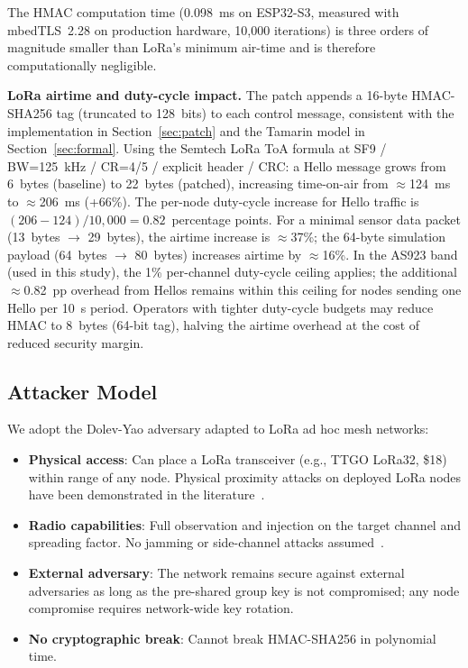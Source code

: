 \documentclass[preprint,12pt]{elsarticle}
\begin{document}
The HMAC computation time (0.098~ms on ESP32-S3, measured with
mbedTLS~2.28 on production hardware, 10{,}000 iterations) is three
orders of magnitude smaller than LoRa's minimum air-time and is
therefore computationally negligible.

\textbf{LoRa airtime and duty-cycle impact.}
The patch appends a 16-byte HMAC-SHA256 tag (truncated to 128~bits)
to each control message, consistent with the implementation
in Section~\ref{sec:patch} and the Tamarin model in
Section~\ref{sec:formal}. Using the Semtech LoRa ToA formula at
SF9 / BW=125~kHz / CR=4/5 / explicit header / CRC:
a Hello message grows from 6~bytes (baseline) to 22~bytes (patched),
increasing time-on-air from $\approx$124~ms to $\approx$206~ms
(+66\%). The per-node duty-cycle increase for Hello traffic is
$(206-124)/10{,}000 = 0.82$~percentage points. For a minimal sensor data packet
(13~bytes $\to$ 29~bytes), the airtime increase is $\approx$37\%;
the 64-byte simulation payload (64~bytes $\to$ 80~bytes) increases
airtime by $\approx$16\%.
In the AS923 band (used in this study), the 1\% per-channel
duty-cycle ceiling applies; the additional $\approx$0.82~pp overhead
from Hellos remains within this ceiling for nodes sending one Hello
per 10~s period. Operators with tighter duty-cycle budgets may
reduce HMAC to 8~bytes (64-bit tag), halving the airtime overhead
at the cost of reduced security margin.

\subsection{Attacker Model}

We adopt the Dolev-Yao adversary adapted to LoRa ad hoc mesh networks:

\begin{itemize}
  \item \textbf{Physical access}: Can place a LoRa transceiver
    (e.g., TTGO LoRa32, \$18) within range of any node.
    Physical proximity attacks on deployed LoRa nodes have been
    demonstrated in the literature~\cite{ieee2025-lora-adversarial,bringye2026-lorawan-ids}.
  \item \textbf{Radio capabilities}: Full observation and injection
    on the target channel and spreading factor. No jamming or
    side-channel attacks assumed~\cite{ieee2025-lorawan-jamming-ids}.
  \item \textbf{External adversary}: The network remains secure against
    external adversaries as long as the pre-shared group key is not
    compromised; any node compromise requires network-wide key rotation.
  \item \textbf{No cryptographic break}: Cannot break HMAC-SHA256
    in polynomial time.
\end{itemize}
\end{document}
